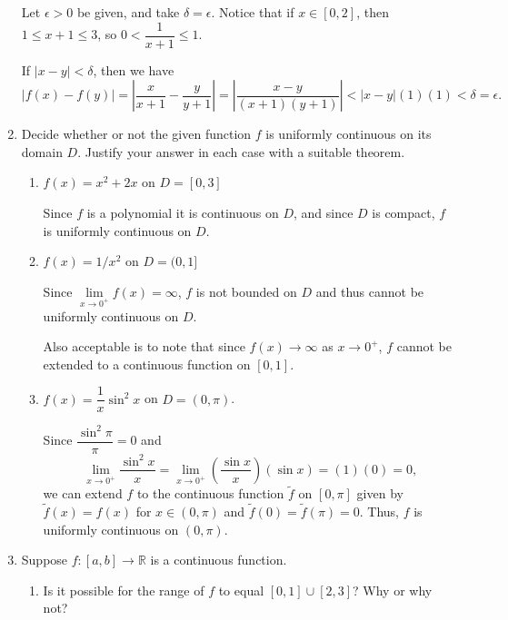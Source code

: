 \documentclass[12pt]{article}
\newcommand{\points}[1]{\marginpar{\hspace{24pt}[#1]}}
\newcommand{\R}{\mathbb{R}}
\newcommand{\abs}[1]{\lvert #1\rvert}
\newcommand{\Abs}[1]{\left| #1 \right|}
\begin{document}
\begin{enumerate}
\bigskip

Let $\epsilon>0$ be given, and take $\delta=\epsilon$. Notice that if $x\in [0,2]$, then $1\leq x+1\leq 3$, so $0<\dfrac{1}{x+1}\leq 1$.

If $\abs{x-y}<\delta$, then we have
\[
\abs{f(x)-f(y)}=\Abs{\frac{x}{x+1}-\frac{y}{y+1}} = \Abs{\frac{x-y}{(x+1)(y+1)}}<\abs{x-y}(1)(1)<\delta = \epsilon.
\]

\bigskip

\newpage
\item Decide whether or not the given function $f$ is uniformly continuous on its domain $D$. Justify your answer in each case with a suitable theorem.
\begin{enumerate}
 \item $f(x)=x^2+2x$ on $D=[0,3]$\points{2}

\bigskip

Since $f$ is a polynomial it is continuous on $D$, and since $D$ is compact, $f$ is uniformly continuous on $D$.

\bigskip


 \item $f(x)=1/x^2$ on $D=(0,1]$\points{2}

\bigskip

Since $\lim\limits_{x\to 0^+}f(x) = \infty$, $f$ is not bounded on $D$ and thus cannot be uniformly continuous on $D$.

Also acceptable is to note that since $f(x)\to \infty$ as $x\to 0^+$, $f$ cannot be extended to a continuous function on $[0,1]$.

\bigskip

 \item $f(x)=\dfrac{1}{x}\sin^2x$ on $D=(0,\pi)$.\points{2}

\bigskip

Since $\dfrac{\sin^2 \pi}{\pi} = 0$ and
\[
\lim_{x\to 0^+}\frac{\sin^2x}{x} = \lim_{x\to 0^+}\left(\frac{\sin x}{x}\right)(\sin x) = (1)(0) = 0,
\]
we can extend $f$ to the continuous function $\tilde{f}$ on $[0,\pi]$ given by $\tilde{f}(x)=f(x)$ for $x\in (0,\pi)$ and $\tilde{f}(0)=\tilde{f}(\pi)=0$. Thus, $f$ is uniformly continuous on $(0,\pi)$.

\bigskip

\end{enumerate}
\item Suppose $f:[a,b]\to \R$ is a continuous function.
\begin{enumerate}
 \item Is it possible for the range of $f$ to equal $[0,1]\cup [2,3]$? Why or why not? \points{2}


\end{enumerate}
\end{enumerate}
\end{document}
